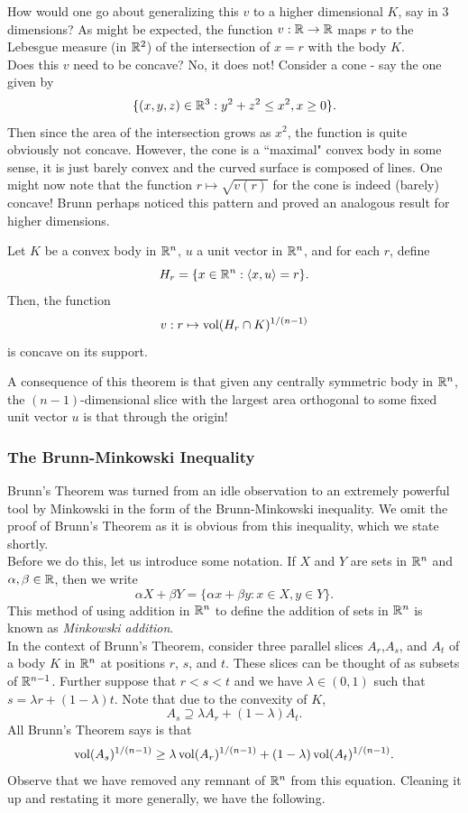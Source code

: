 How would one go about generalizing this $v$ to a higher dimensional $K$, say in $3$ dimensions? As might be expected, the function $v:\mathbb{R}\to\mathbb{R}$ maps $r$ to the Lebesgue measure (in $\mathbb{R}^2$) of the intersection of $x=r$ with the body $K$.\\
Does this $v$ need to be concave? No, it does not! Consider a cone - say the one given by
\[\{(x,y,z)\in\mathbb{R}^3 : y^2+z^2\leq x^2, x\geq 0\}.\]
Then since the area of the intersection grows as $x^2$, the function is quite obviously not concave. However, the cone is a ``maximal" convex body in some sense, it is just barely convex and the curved surface is composed of lines. One might now note that the function $r\mapsto \sqrt{v(r)}$ for the cone is indeed (barely) concave! Brunn perhaps noticed this pattern and proved an analogous result for higher dimensions.

\begin{ftheo}
\label{brunn's theorem}
Let $K$ be a convex body in $\mathbb{R}^n$, $u$ a unit vector in $\mathbb{R}^n$, and for each $r$, define
\[ H_r = \{x\in\mathbb{R}^n : \langle x,u\rangle = r\}. \]
Then, the function
\[ v:r\mapsto \operatorname{vol}(H_r\cap K)^{1/(n-1)} \]
is concave on its support.
\end{ftheo}

A consequence of this theorem is that given any centrally symmetric body in $\mathbb{R}^n$, the $(n-1)$-dimensional slice with the largest area orthogonal to some fixed unit vector $u$ is that through the origin!

\subsubsection{The Brunn-Minkowski Inequality}

Brunn's Theorem was turned from an idle observation to an extremely powerful tool by Minkowski in the form of the Brunn-Minkowski inequality. We omit the proof of Brunn's Theorem as it is obvious from this inequality, which we state shortly.\\

Before we do this, let us introduce some notation. If $X$ and $Y$ are sets in $\mathbb{R}^n$ and $\alpha,\beta\in\mathbb{R}$, then we write
\[ \alpha X + \beta Y = \{ \alpha x + \beta y : x \in X, y \in Y \}. \]
This method of using addition in $\mathbb{R}^n$ to define the addition of sets in $\mathbb{R}^n$ is known as \textit{Minkowski addition}.\\
In the context of Brunn's Theorem, consider three parallel slices $A_r$,$A_s$, and $A_t$ of a body $K$ in $\mathbb{R}^n$ at positions $r$, $s$, and $t$. These slices can be thought of as subsets of $\mathbb{R}^{n-1}$. Further suppose that $r<s<t$ and we have $\lambda\in(0,1)$ such that $s = \lambda r + (1-\lambda)t$. Note that due to the convexity of $K$, 
\[A_s \supseteq \lambda A_r + (1-\lambda)A_t.\]
All Brunn's Theorem says is that
\[ \operatorname{vol}(A_s)^{1/(n-1)} \geq \lambda \operatorname{vol}(A_r)^{1/(n-1)} + (1-\lambda) \operatorname{vol}(A_t)^{1/(n-1)}. \]
Observe that we have removed any remnant of $\mathbb{R}^n$ from this equation. Cleaning it up and restating it more generally, we have the following.

